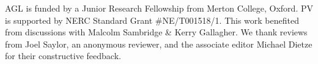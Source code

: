 \documentclass[gchron, manuscript]{copernicus}
\begin{document}


\begin{acknowledgements}

AGL is funded by a Junior Research Fellowship from Merton College, Oxford. PV is supported by NERC Standard Grant \#NE/T001518/1. This work benefited from discussions with Malcolm Sambridge \& Kerry Gallagher. We thank reviews from Joel Saylor, an anonymous reviewer, and the associate editor Michael Dietze for their constructive feedback. 

\end{acknowledgements}















\end{document}
